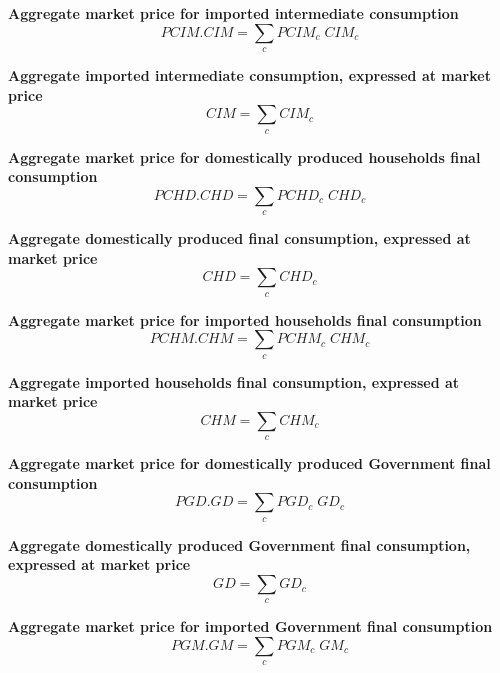 \documentclass[12pt]{article}
\numberwithin{equation}{section}
\begin{document}
\noindent \textbf{Aggregate market price for imported intermediate consumption} 
\begin{dmath}
PCIM . CIM = \sum_{c} PCIM_{c} \; CIM_{c}
\label{SU.mdlPCIM}
\end{dmath}

\noindent \textbf{ Aggregate imported intermediate consumption, expressed at market price} 
\begin{dmath}
CIM = \sum_{c} CIM_{c}
\label{SU.mdlCIM}
\end{dmath}

\noindent \textbf{Aggregate market price for domestically produced households final consumption} 
\begin{dmath}
PCHD . CHD = \sum_{c} PCHD_{c} \; CHD_{c}
\label{SU.mdlPCHD}
\end{dmath}

\noindent \textbf{Aggregate domestically produced final consumption, expressed at market price} 
\begin{dmath}
CHD = \sum_{c} CHD_{c}
\label{SU.mdlCHD}
\end{dmath}

\noindent \textbf{Aggregate market price for imported households final consumption} 
\begin{dmath}
PCHM . CHM = \sum_{c} PCHM_{c} \; CHM_{c}
\label{SU.mdlPCHM}
\end{dmath}

\noindent \textbf{Aggregate imported households final consumption, expressed at market price} 
\begin{dmath}
CHM = \sum_{c} CHM_{c}
\label{SU.mdlCHM}
\end{dmath}

\noindent \textbf{Aggregate market price for domestically produced Government final consumption} 
\begin{dmath}
PGD . GD = \sum_{c} PGD_{c} \; GD_{c}
\label{SU.mdlPGD}
\end{dmath}

\noindent \textbf{Aggregate domestically produced Government final consumption, expressed at market price} 
\begin{dmath}
GD = \sum_{c} GD_{c}
\label{SU.mdlGD}
\end{dmath}

\noindent \textbf{Aggregate market price for imported Government final consumption} 
\begin{dmath}
PGM . GM = \sum_{c} PGM_{c} \; GM_{c}
\label{SU.mdlPGM}
\end{dmath}
\end{document}
